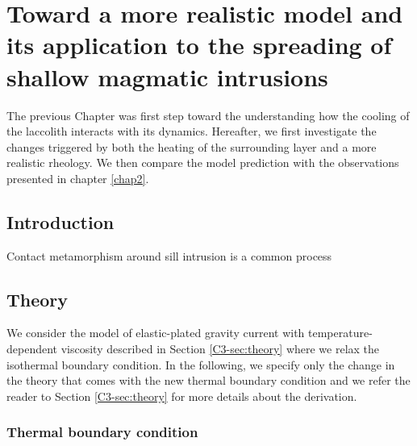 
\chapter{Toward  a more  realistic model  and its  application to  the
  spreading of shallow magmatic intrusions}
\label{Heating}

\minitoc The previous Chapter was  first step toward the understanding
how  the  cooling  of  the  laccolith  interacts  with  its  dynamics.
Hereafter,  we first  investigate the  changes triggered  by both  the
heating of  the surrounding  layer and a  more realistic  rheology. We
then compare the  model prediction with the  observations presented in
chapter \ref{chap2}.

\section{Introduction}
\label{C4-sec:introduction}
 
Contact metamorphism around sill intrusion is a common process

\citep{Everett:2008tn}

\section{Theory}
\label{C4-sec:theory-1}

We  consider   the  model  of  elastic-plated   gravity  current  with
temperature-dependent      viscosity     described      in     Section
\ref{C3-sec:theory}   where   we   relax   the   isothermal   boundary
condition. In the following, we specify  only the change in the theory
that comes  with the new thermal  boundary condition and we  refer the
reader  to  Section \ref{C3-sec:theory}  for  more  details about  the
derivation.

\subsection{Thermal boundary condition}
\label{C4-sec:formulation-1}

